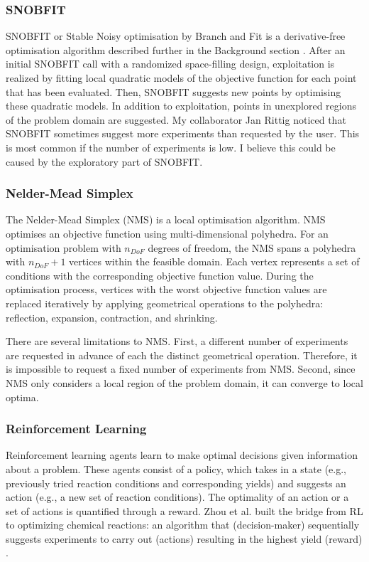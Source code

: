 \subsubsection{SNOBFIT}
SNOBFIT or Stable Noisy optimisation by Branch and Fit is a derivative-free optimisation algorithm described further in the Background section \cite{Huyer2008}.  After an initial SNOBFIT call with a randomized space-filling design, exploitation is realized by fitting local quadratic  models of the objective function for each point that has been evaluated. Then, SNOBFIT suggests new points by optimising these quadratic models. In addition to exploitation, points in unexplored regions of the problem domain are suggested. My collaborator Jan Rittig noticed that SNOBFIT sometimes suggest more experiments than requested by the user. This is most common if the number of experiments is low. I believe this could be caused by the exploratory part of SNOBFIT.

 \subsubsection{Nelder-Mead Simplex}
The Nelder-Mead Simplex (NMS)\cite{Nelder1965} is a local optimisation algorithm.  NMS optimises an objective function using multi-dimensional polyhedra. For an optimisation problem with $n_{DoF}$ degrees of freedom, the NMS spans a polyhedra with $n_{DoF} + 1$ vertices within the feasible domain. Each vertex represents a set of conditions with the corresponding objective function value.  During the optimisation process, vertices with the worst objective function values are replaced iteratively by applying geometrical operations to the polyhedra: reflection, expansion, contraction, and shrinking. 

There are several limitations to NMS. First, a different number of experiments are requested in advance of each the distinct geometrical operation. Therefore, it is impossible to request a fixed number of experiments from NMS.  Second, since NMS only considers a local region of the problem domain, it can converge to local optima. 
\subsubsection{Reinforcement Learning}
Reinforcement learning agents learn to make optimal decisions given information about a problem.\cite{sutton2018reinforcement} These agents consist of a policy, which takes in a state (e.g., previously tried reaction conditions and corresponding yields) and suggests an action (e.g., a new set of reaction conditions). The optimality of an action or a set of actions is quantified through a reward. Zhou et al. built the bridge from RL to optimizing chemical reactions: an algorithm that (decision-maker) sequentially suggests experiments to carry out (actions) resulting in the highest yield (reward) \cite{Zhou2017}.

